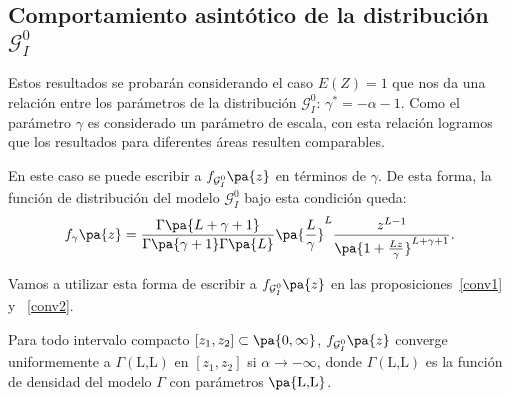 \subsection{Comportamiento asintótico de la distribución $\mathcal{G}_I^0$}
Estos resultados se probarán considerando el caso $E(Z)=1$ que nos da una relación entre los parámetros de la distribución $\mathcal{G}_I^0$: $\gamma^*=-\alpha-1$. Como el parámetro $\gamma$ es considerado un parámetro de escala, con esta relación logramos que los resultados para diferentes áreas resulten comparables.
 
En este caso se puede escribir a $f_{\mathcal{G}_I^0}\pa{z}$ en términos de $\gamma$. De esta forma, la función de distribución del modelo $\mathcal{G}_I^0$ bajo esta condición queda:
\begin{align}
\label{fenfunciondegamma}
f_{\gamma}\pa{z}=\frac{\Gamma\pa{L+\gamma+1}}{\Gamma\pa{\gamma+1}\Gamma\pa{L}}
\pa{\frac{L}{\gamma}}^L \frac{z^{L-1}}{\pa{1+\frac{Lz}{\gamma}}^{L+\gamma+1}}.
\end{align}

Vamos a utilizar esta forma de escribir a $f_{\mathcal{G}_I^0}\pa{z}$ en las proposiciones~\ref{conv1} y ~\ref{conv2}.

\begin{proposition}
	\label{conv1}
	Para todo intervalo compacto $[z_{1},z_{2}]\subset\pa{0,\infty}$, $f_{\mathcal{G}_I^0}\pa{z}$ converge
	uniformemente a $\Gamma(\text{L,L})$ en $[z_{1},z_{2}]$ si $\alpha\to -\infty$,
	donde $\Gamma(\text{L,L})$ es la función de densidad del modelo $\Gamma$ con parámetros $\pa{\text{L,L}}$.
\end{proposition}

